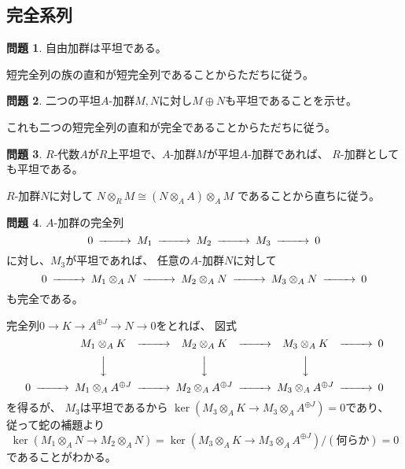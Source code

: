 \documentclass[uplatex]{jsarticle}
\makeatletter
\theoremstyle{definition}
\newtheorem{prob}[prob]{問題}
\renewenvironment{proof}[1][\proofname]{
  \pushQED{\qed}%
  \normalfont \topsep6\p@\@plus6\p@\relax
  \trivlist
  \item[\hskip\labelsep
    #1\@addpunct{\textbf{.}}]\ignorespaces
}{%
  \popQED\endtrivlist\@endpefalse
}
\providecommand{\proofname}{証明}
\makeatother
\begin{document}
\subsection{完全系列}

\begin{prob}\label{prob: 1.4.1}
  自由加群は平坦である。
\end{prob}

\begin{proof}
  短完全列の族の直和が短完全列であることからただちに従う。
\end{proof}




\begin{prob}\label{prob: 1.4.2}
  二つの平坦\(A\)-加群\(M,N\)に対し\(M\oplus N\)も平坦であることを示せ。
\end{prob}

\begin{proof}
  これも二つの短完全列の直和が完全であることからただちに従う。
\end{proof}


\begin{prob}\label{prob: 1.4.3}
  \(R\)-代数\(A\)が\(R\)上平坦で、\(A\)-加群\(M\)が平坦\(A\)-加群であれば、
  \(R\)-加群としても平坦である。
\end{prob}

\begin{proof}
  \(R\)-加群\(N\)に対して
  \(N\otimes_R M \cong (N\otimes_A A)\otimes_A M\)
  であることから直ちに従う。
\end{proof}

\begin{prob}\label{prob: 1.4.4}
  \(A\)-加群の完全列
  \[
  \begin{CD}
    0 @>>> M_1 @>>> M_2 @>>> M_3 @>>> 0
  \end{CD}
  \]
  に対し、\(M_3\)が平坦であれば、
  任意の\(A\)-加群\(N\)に対して
  \[
  \begin{CD}
    0 @>>> M_1\otimes_A N @>>> M_2\otimes_A N @>>> M_3\otimes_A N @>>> 0
  \end{CD}
  \]
  も完全である。
\end{prob}

\begin{proof}
  完全列\(0\to K\to A^{\oplus J} \to N\to 0\)をとれば、
  図式
  \[
  \begin{CD}
    @. M_1\otimes_A K @>>> M_2\otimes_A K @>>> M_3\otimes_A K @>>> 0 \\
    @. @VVV @VVV @VVV @. \\
    0 @>>> M_1\otimes_A A^{\oplus J} @>>> M_2\otimes_A A^{\oplus J}
    @>>> M_3\otimes_A A^{\oplus J} @>>> 0
  \end{CD}
  \]
  を得るが、
  \(M_3\)は平坦であるから
  \(\ker(M_3\otimes_A K \to M_3\otimes_A A^{\oplus J}) = 0\)であり、
  従って蛇の補題より
  \[
  \ker(M_1\otimes_A N\to M_2\otimes_A N) =
  \ker(M_3\otimes_A K \to M_3\otimes_A A^{\oplus J})/ (\text{何らか}) = 0
  \]
  であることがわかる。
\end{proof}
\end{document}
